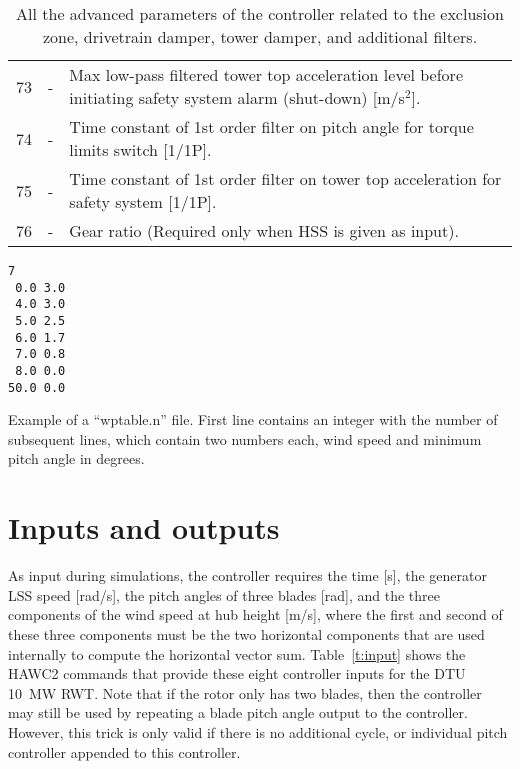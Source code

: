 \begin{table}[t!]
\begin{center}
\begin{tabular}{r|c|p{11.5cm}}
 73  & - 			& Max low-pass filtered tower top acceleration level before initiating safety system alarm (shut-down) [m/s${}^2$]. \\ 
 74  & - 			&Time constant of 1st order filter on pitch angle for torque limits switch [1/1P]. \\ 
 75  & - 			&Time constant of 1st order filter on tower top acceleration for safety system  [1/1P]. \\ 
 \hline
 76  &- 			& Gear ratio (Required only when HSS is given as input).\\
\end{tabular}
\caption{All the advanced parameters of the controller related to the exclusion zone, drivetrain damper, tower damper, and additional filters. \label{t:par2}}
\end{center}
\end{table}


\begin{table}[t]
\begin{center}
\begin{verbatim}
7
 0.0 3.0
 4.0 3.0
 5.0 2.5
 6.0 1.7
 7.0 0.8
 8.0 0.0
50.0 0.0
\end{verbatim}
\caption{Example of a ``wptable.n'' file. First line contains an integer with the number of subsequent lines, which contain two numbers each, wind speed and minimum pitch angle in degrees.\label{t:wptable}}
\end{center}
\end{table}

\section{Inputs and outputs}

As input during simulations, the controller requires the time [s], the generator LSS speed [rad/s], the pitch angles of three blades [rad], and the three components of the wind speed at hub height [m/s], where the first and second of these three components must be the two horizontal components that are used internally to compute the horizontal vector sum. Table~\ref{t:input} shows the HAWC2 commands that provide these eight controller inputs for the DTU 10~MW RWT. Note that if the rotor only has two blades, then the controller may still be used by repeating a blade pitch angle output to the controller. However, this trick is only valid if there is no additional cycle, or individual pitch controller appended to this controller.


